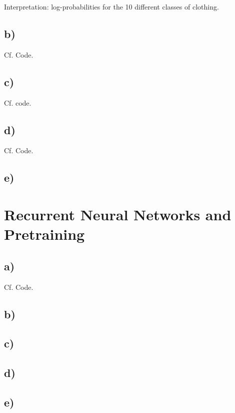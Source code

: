 \documentclass[11pt]{article}
\begin{document}
Interpretation: log-probabilities for the 10 different classes of clothing.

\subsection{b)}\label{subsec:cnn-b}
Cf. Code.



\subsection{c)}\label{subsec:cnn-c}
Cf. code.
\subsection{d)}\label{subsec:cnn-d}
Cf. Code.
\subsection{e)}\label{subsec:cnn-e}


\newpage

\section{Recurrent Neural Networks and Pretraining}\label{sec:rnn}
\subsection{a)}\label{subsec:rnn-a}
Cf. Code.
\subsection{b)}\label{subsec:rnn-b}

\subsection{c)}\label{subsec:rnn-c}

\subsection{d)}\label{subsec:rnn-d}

\subsection{e)}\label{subsec:rnn-e}




\end{document}
